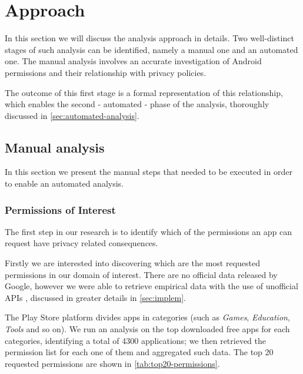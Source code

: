 \documentclass[twoside,letterpaper]{soups}
\theoremstyle{definition}
\begin{document}
\section{Approach}
\label{sec:overview}
In this section we will discuss the analysis approach in details. Two well-distinct stages of such analysis can be identified, namely a manual one and an automated one.
The manual analysis involves an accurate investigation of Android permissions and their relationship with privacy policies.

The outcome of this first stage is a formal representation of this relationship, which enables the second - automated - phase of the analysis, thoroughly discussed in \autoref{sec:automated-analysis}.

\subsection{Manual analysis}
In this section we present the manual steps that needed to be executed in order to enable an automated analysis.

\subsubsection{Permissions of Interest}
The first step in our research is to identify which of the permissions an app can request have privacy related consequences.

Firstly we are interested into discovering which are the most requested permissions in our domain of interest.
There are no official data released by Google, however we were able to retrieve empirical data with the use of
unofficial APIs \cite{play-store-unofficial-api}, discussed in greater details in \autoref{sec:implem}.

The Play Store platform divides apps in categories (such as \emph{Games}, \emph{Education}, \emph{Tools} and so on). We run
an analysis on the top downloaded free apps for each categories, identifying a total of 4300 applications;
we then retrieved the permission list for each one of them and aggregated such data. The top 20 requested permissions are shown in \autoref{tab:top20-permissions}.
\end{document}
